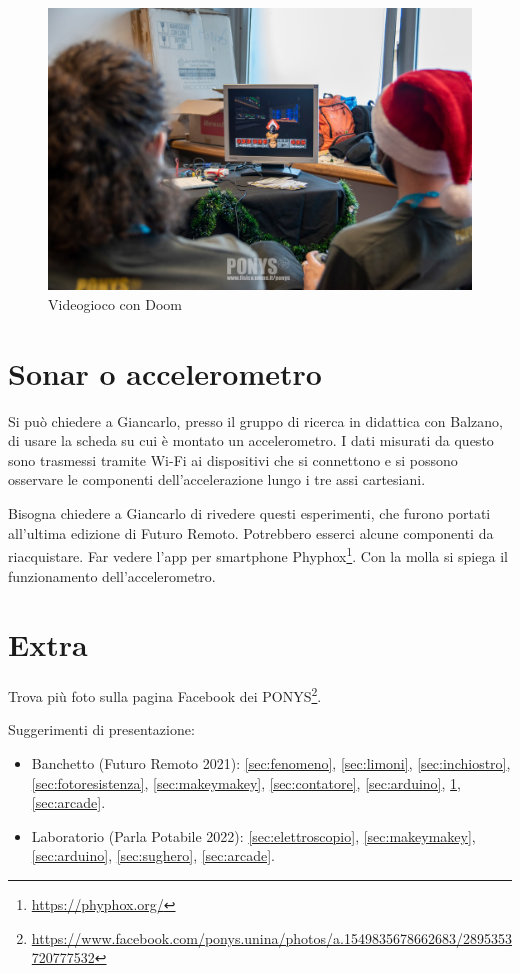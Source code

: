 \documentclass[a4paper]{article}
\begin{document}
\begin{figure}[ht]
  \centering
  \includegraphics[width=\linewidth]{figures/doom}
  \caption{\label{fig:doom} Videogioco con Doom}
\end{figure}

\section{Sonar o accelerometro}%
\label{sec:sonar-accelerometro}

Si può chiedere a Giancarlo, presso il gruppo di ricerca in didattica con
Balzano, di usare la scheda su cui è montato un accelerometro. I dati misurati
da questo sono trasmessi tramite Wi-Fi ai dispositivi che si connettono e si
possono osservare le componenti dell'accelerazione lungo i tre assi cartesiani.

Bisogna chiedere a Giancarlo di rivedere questi esperimenti, che furono portati
all'ultima edizione di Futuro Remoto. Potrebbero esserci alcune componenti da
riacquistare. Far vedere l'app per smartphone Phyphox\footnote{
  \url{https://phyphox.org/} }. Con la molla si spiega il funzionamento
dell'accelerometro.

\section{Extra}%
\label{sec:extra}

Trova più foto sulla pagina Facebook dei PONYS\footnote{
  \url{https://www.facebook.com/ponys.unina/photos/a.1549835678662683/2895353720777532}
}.

Suggerimenti di presentazione:
\begin{itemize}
  \item Banchetto (Futuro Remoto 2021): \ref{sec:fenomeno}, \ref{sec:limoni},
        \ref{sec:inchiostro}, \ref{sec:fotoresistenza}, \ref{sec:makeymakey},
        \ref{sec:contatore}, \ref{sec:arduino}, \ref{sec:sonar-accelerometro},
        \ref{sec:arcade}.
  \item Laboratorio (Parla Potabile 2022): \ref{sec:elettroscopio},
        \ref{sec:makeymakey}, \ref{sec:arduino}, \ref{sec:sughero},
        \ref{sec:arcade}.
\end{itemize}
\end{document}
